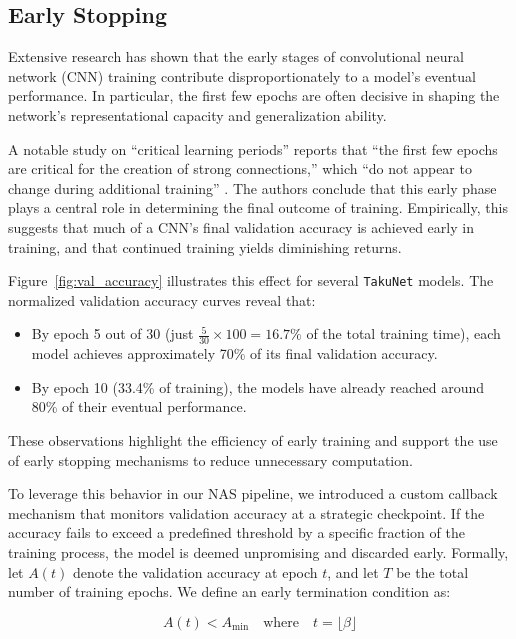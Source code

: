 \subsection{Early Stopping}
\label{sec:early_stopping}

Extensive research has shown that the early stages of convolutional neural network (CNN) training contribute disproportionately to a model's eventual performance. In particular, the first few epochs are often decisive in shaping the network's representational capacity and generalization ability.

A notable study on “critical learning periods” reports that “the first few epochs are critical for the creation of strong connections,” which “do not appear to change during additional training” \cite{achille2017critical}. The authors conclude that this early phase plays a central role in determining the final outcome of training. Empirically, this suggests that much of a CNN’s final validation accuracy is achieved early in training, and that continued training yields diminishing returns.

Figure~\ref{fig:val_accuracy} illustrates this effect for several \texttt{TakuNet} models. The normalized validation accuracy curves reveal that:
\begin{itemize}
  \item By epoch 5 out of 30 (just \( \frac{5}{30} \times 100 = 16.7\% \) of the total training time), each model achieves approximately 70\% of its final validation accuracy.
  \item By epoch 10 (33.4\% of training), the models have already reached around 80\% of their eventual performance.
\end{itemize}

These observations highlight the efficiency of early training and support the use of early stopping mechanisms to reduce unnecessary computation.

To leverage this behavior in our NAS pipeline, we introduced a custom callback mechanism that monitors validation accuracy at a strategic checkpoint. If the accuracy fails to exceed a predefined threshold by a specific fraction of the training process, the model is deemed unpromising and discarded early. Formally, let \( A(t) \) denote the validation accuracy at epoch \( t \), and let \( T \) be the total number of training epochs. We define an early termination condition as:

\[
A(t) < A_{\min} \quad \text{where} \quad t = \lfloor \beta \rfloor
\]

